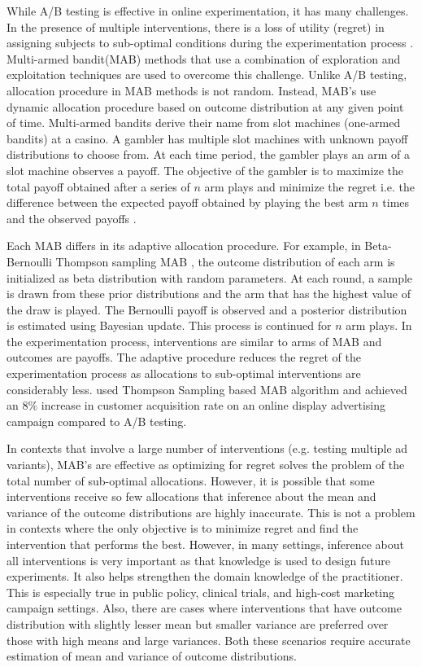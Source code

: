 \documentclass[12pt, letterpaper]{article}
\begin{document}
While A/B testing is effective in online experimentation, it has many challenges. In the presence of multiple interventions, there is a loss of utility (regret) in assigning subjects to sub-optimal conditions during the experimentation process \citep{white2012bandit}. Multi-armed bandit(MAB) methods that use a combination of exploration and exploitation techniques are used to overcome this challenge. Unlike A/B testing, allocation procedure in MAB methods is not random. Instead, MAB's use dynamic allocation procedure based on outcome distribution at any given point of time. Multi-armed bandits derive their name from slot machines (one-armed bandits) at a casino. A gambler has multiple slot machines with unknown payoff distributions to choose from. At each time period, the gambler plays an arm of a slot machine observes a payoff. The objective of the gambler is to maximize the total payoff obtained after a series of $n$ arm plays and minimize the regret i.e. the difference between the expected payoff obtained by playing the best arm $n$ times and the observed payoffs \citep{lattimore2018bandit}. 

Each MAB differs in its adaptive allocation procedure. For example, in Beta-Bernoulli Thompson sampling MAB \citep{thompson1933likelihood}, the outcome distribution of each arm is initialized as beta distribution with random parameters. At each round, a sample is drawn from these prior distributions and the arm that has the highest value of the draw is played. The Bernoulli payoff is observed and a posterior distribution is estimated using Bayesian update. This process is continued for $n$ arm plays. In the experimentation process, interventions are similar to arms of MAB and outcomes are payoffs. The adaptive procedure reduces the regret of the experimentation process as allocations to sub-optimal interventions are considerably less. \cite{schwartz2017customer} used Thompson Sampling based MAB algorithm and achieved an 8\% increase in customer acquisition rate on an online display advertising campaign compared to A/B testing.

In contexts that involve a large number of interventions (e.g. testing multiple ad variants), MAB's are effective as optimizing for regret solves the problem of the total number of sub-optimal allocations. However, it is possible that some interventions receive so few allocations that inference about the mean and variance of the outcome distributions are highly inaccurate. This is not a problem in contexts where the only objective is to minimize regret and find the intervention that performs the best. However, in many settings, inference about all interventions is very important as that knowledge is used to design future experiments. It also helps strengthen the domain knowledge of the practitioner. This is especially true in public policy, clinical trials, and high-cost marketing campaign settings. Also, there are cases where interventions that have outcome distribution with slightly lesser mean but smaller variance are preferred over those with high means and large variances. Both these scenarios require accurate estimation of mean and variance of outcome distributions.
\end{document}
